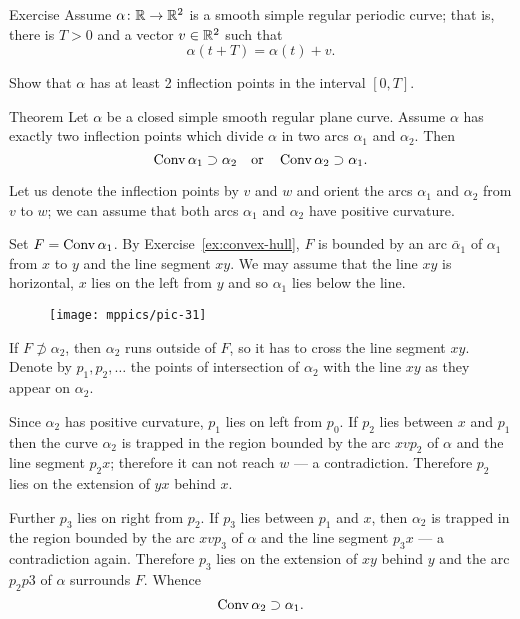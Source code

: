 \begin{thm}{Exercise}
Assume $\alpha\colon\mathbb{R}\to\mathbb{R}^2$ is a smooth simple regular periodic curve;
that is, there is $T>0$ and a vector $v\in\mathbb{R}^2$ such that 
\[\alpha(t+T)=\alpha(t)+v.\]

Show that $\alpha$ has at least 2 inflection points in the interval $[0,T]$.

\end{thm}

\begin{thm}{Theorem} 
Let $\alpha$ be a closed simple smooth regular plane curve.
Assume $\alpha$ has exactly two inflection points which divide $\alpha$ in two arcs $\alpha_1$ and $\alpha_2$.
Then 
\[\mathop{\rm Conv}\nolimits \alpha_1\supset \alpha_2
\quad\text{or}\quad
\mathop{\rm Conv}\nolimits \alpha_2\supset \alpha_1.\]

\end{thm}

Let us denote the inflection points by $v$ and $w$
and orient the arcs $\alpha_1$ and $\alpha_2$ from $v$ to $w$; we can assume that both arcs $\alpha_1$ and $\alpha_2$ have positive curvature.

Set $F=\mathop{\rm Conv}\nolimits \alpha_1$.
By Exercise~\ref{ex:convex-hull}, $F$ is bounded by an arc $\bar\alpha_1$ of $\alpha_1$ from $x$ to $y$ 
and the line segment $xy$.
We may assume that the line $xy$ is horizontal, $x$ lies on the left from $y$ and so $\alpha_1$ lies below the line.

\begin{figure}[h!]
\vskip-0mm
\centering
\texttt{[image: mppics/pic-31]}
\vskip0mm
\end{figure}

If $F\not\supset \alpha_2$, then $\alpha_2$ runs outside of $F$, so it has to cross the line segment $xy$.
Denote by $p_1, p_2,\dots$ the points of intersection of $\alpha_2$ with the line $xy$ as they appear on $\alpha_2$.

Since $\alpha_2$ has positive curvature, $p_1$ lies on left from $p_0$.
If $p_2$ lies between $x$ and $p_1$ then the curve $\alpha_2$ is trapped in the region bounded by the arc $xvp_2$ of $\alpha$ and the line segment $p_2x$;
therefore it can not reach $w$ --- a contradiction.
Therefore $p_2$ lies on the extension of $yx$ behind $x$.

Further $p_3$ lies on right from $p_2$. 
If $p_3$ lies between $p_1$ and $x$, then $\alpha_2$ is trapped in the region bounded by the arc $xvp_3$ of $\alpha$ and the line segment $p_3x$ --- a contradiction again.
Therefore $p_3$ lies on the extension of $xy$ behind $y$ and the arc $p_2p3$ of $\alpha$ surrounds $F$.
Whence
\[\mathop{\rm Conv}\nolimits \alpha_2\supset \alpha_1.\]
\qedsf


